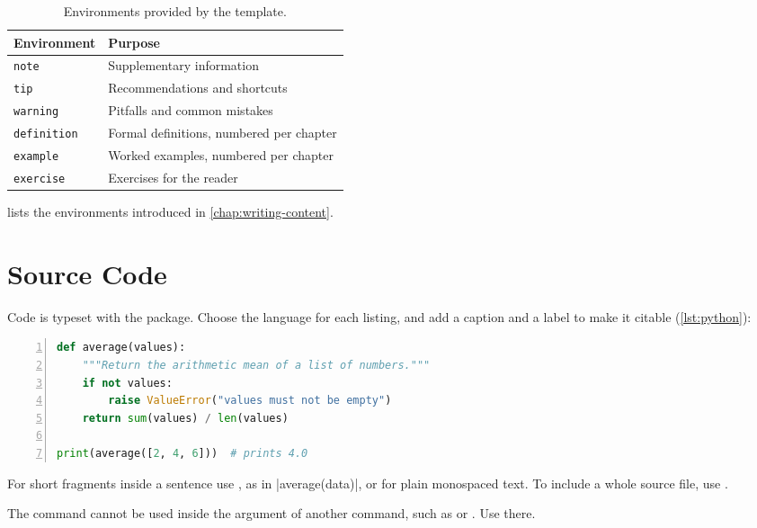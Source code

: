 \begin{table}[tb]
  \centering
  \caption{Environments provided by the template.}
  \label{tab:environments}
  \begin{tabularx}{\linewidth}{@{}lX@{}}
    \toprule
    Environment & Purpose \\
    \midrule
    \texttt{note}       & Supplementary information \\
    \texttt{tip}        & Recommendations and shortcuts \\
    \texttt{warning}    & Pitfalls and common mistakes \\
    \texttt{definition} & Formal definitions, numbered per chapter \\
    \texttt{example}    & Worked examples, numbered per chapter \\
    \texttt{exercise}   & Exercises for the reader \\
    \bottomrule
  \end{tabularx}
\end{table}

 lists the environments introduced in
\cref{chap:writing-content}.

\section{Source Code}\label{sec:code}

Code is typeset with the  package. Choose the language for each
listing, and add a caption and a label to make it citable
(\cref{lst:python}):

\begin{lstlisting}[language=Python, caption={A short Python function.},
                   label={lst:python}, numbers=left, xleftmargin=2.2em]
def average(values):
    """Return the arithmetic mean of a list of numbers."""
    if not values:
        raise ValueError("values must not be empty")
    return sum(values) / len(values)

print(average([2, 4, 6]))  # prints 4.0
\end{lstlisting}

For short fragments inside a sentence use , as in
\code|average(data)|, or  for plain monospaced text. To include
a whole source file, use .

\begin{warning}
The  command cannot be used inside the argument of another
command, such as  or . Use  there.
\end{warning}

